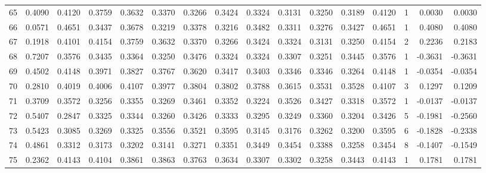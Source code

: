 \begin{tabular}{lrrrrrrrrrrrrrrr}
65  &      0.4090 &  0.4120 &  0.3759 &  0.3632 &  0.3370 &  0.3266 &  0.3424 &  0.3324 &  0.3131 &  0.3250 &   0.3189 &     0.4120 &      1 &                    0.0030 &                     0.0030 \\
66  &      0.0571 &  0.4651 &  0.3437 &  0.3678 &  0.3219 &  0.3378 &  0.3216 &  0.3482 &  0.3311 &  0.3276 &   0.3427 &     0.4651 &      1 &                    0.4080 &                     0.4080 \\
67  &      0.1918 &  0.4101 &  0.4154 &  0.3759 &  0.3632 &  0.3370 &  0.3266 &  0.3424 &  0.3324 &  0.3131 &   0.3250 &     0.4154 &      2 &                    0.2236 &                     0.2183 \\
68  &      0.7207 &  0.3576 &  0.3435 &  0.3364 &  0.3250 &  0.3476 &  0.3324 &  0.3324 &  0.3307 &  0.3251 &   0.3445 &     0.3576 &      1 &                   -0.3631 &                    -0.3631 \\
69  &      0.4502 &  0.4148 &  0.3971 &  0.3827 &  0.3767 &  0.3620 &  0.3417 &  0.3403 &  0.3346 &  0.3346 &   0.3264 &     0.4148 &      1 &                   -0.0354 &                    -0.0354 \\
70  &      0.2810 &  0.4019 &  0.4006 &  0.4107 &  0.3977 &  0.3804 &  0.3802 &  0.3788 &  0.3615 &  0.3531 &   0.3528 &     0.4107 &      3 &                    0.1297 &                     0.1209 \\
71  &      0.3709 &  0.3572 &  0.3256 &  0.3355 &  0.3269 &  0.3461 &  0.3352 &  0.3224 &  0.3526 &  0.3427 &   0.3318 &     0.3572 &      1 &                   -0.0137 &                    -0.0137 \\
72  &      0.5407 &  0.2847 &  0.3325 &  0.3344 &  0.3260 &  0.3426 &  0.3333 &  0.3295 &  0.3249 &  0.3360 &   0.3204 &     0.3426 &      5 &                   -0.1981 &                    -0.2560 \\
73  &      0.5423 &  0.3085 &  0.3269 &  0.3325 &  0.3556 &  0.3521 &  0.3595 &  0.3145 &  0.3176 &  0.3262 &   0.3200 &     0.3595 &      6 &                   -0.1828 &                    -0.2338 \\
74  &      0.4861 &  0.3312 &  0.3173 &  0.3202 &  0.3141 &  0.3271 &  0.3351 &  0.3449 &  0.3454 &  0.3388 &   0.3258 &     0.3454 &      8 &                   -0.1407 &                    -0.1549 \\
75  &      0.2362 &  0.4143 &  0.4104 &  0.3861 &  0.3863 &  0.3763 &  0.3634 &  0.3307 &  0.3302 &  0.3258 &   0.3443 &     0.4143 &      1 &                    0.1781 &                     0.1781 \\

\end{tabular}

